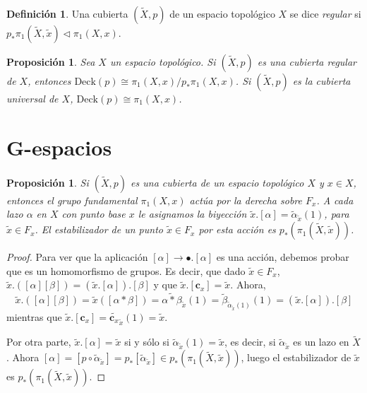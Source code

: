 \documentclass[12pt,a4paper]{book}
\newtheorem{prop}[thm]{Proposición}
\theoremstyle{definition} \newtheorem{defn}[thm]{Definición}
\theoremstyle{definition} \newtheorem{ejemplo}[thm]{Ejemplo}
\theoremstyle{definition} \newtheorem{ejercicio}[thm]{Ejercicio}
\theoremstyle{remark} \newtheorem*{obs}{Observación}
\def\cc{\mathbf{c}}
\def\gf{\pi_1}
\def\XX{\tilde{X}}
\def\xx{\tilde{x}}
\def\DD{\mathrm{Deck}}
\begin{document}
\begin{defn}
  Una cubierta $(\XX,p)$ de un espacio topológico $X$ se dice \emph{regular} si $p_*\gf(\XX,\xx)\lhd \gf(X,x)$.  
\end{defn}

\begin{prop}\label{reguni}
  Sea $X$ un espacio topológico. Si $(\XX,p)$ es una cubierta regular de $X$, entonces $\DD(p)\cong \gf(X,x)/p_*\gf(X,x)$. Si $(\XX,p)$ es la cubierta universal de $X$, $\DD(p)\cong \gf(X,x)$.
\end{prop}

\section{G-espacios}
\begin{prop}\label{actuafibra}
  Si $(\XX,p)$ es una cubierta de un espacio topológico $X$ y $x\in X$, entonces el grupo fundamental $\gf(X,x)$ actúa por la derecha sobre $F_x$. A cada lazo $\alpha$ en $X$ con punto base $x$ le asignamos la biyección $\xx.[\alpha]=\tilde{\alpha}_{\xx}(1)$, para $\xx \in F_x$. El estabilizador de un punto $\xx\in F_x$ por esta acción es $p_*(\gf(\XX,\xx))$.
\end{prop}
\begin{proof}
  Para ver que la aplicación $[\alpha]\rightarrow \bullet.[\alpha]$ es una acción, debemos probar que es un homomorfismo de grupos. Es decir, que dado $\xx\in F_x$, $\xx.([\alpha][\beta])=(\xx.[\alpha]).[\beta]$ y que $\xx.[\cc_x]=\xx$. Ahora,
  \begin{equation*}
    \xx.([\alpha][\beta])=\xx([\alpha*\beta])=\widetilde{\alpha*\beta}_{\xx}(1)=\tilde{\beta}_{\tilde{\alpha}_{\xx}(1)}(1)=(\xx.[\alpha]).[\beta]
  \end{equation*}
  mientras que $\xx.[\cc_x]=\tilde{\cc_x}_{\xx}(1)=\xx$.

  Por otra parte, $\xx.[\alpha]=\xx$ si y sólo si $\tilde{\alpha}_{\xx}(1)=\xx$, es decir, si $\tilde{\alpha}_{\xx}$ es un lazo en $\XX$. Ahora $[\alpha]=[p\circ \tilde{\alpha}_{\xx}]=p_*[\tilde{\alpha}_{\xx}]\in p_*(\gf(\XX,\xx))$, luego el estabilizador de $\xx$ es $p_*(\gf(\XX,\xx))$.
\end{proof}
\end{document}
